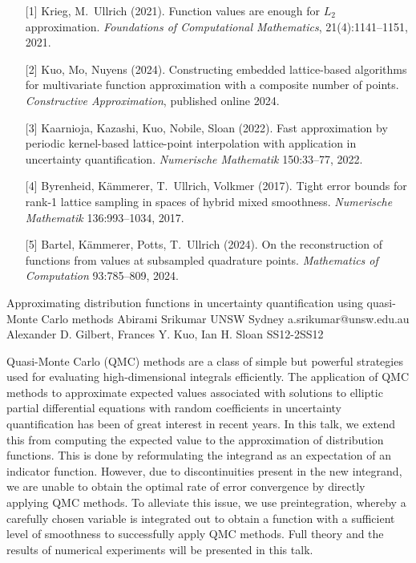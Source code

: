 \begin{talk}
\begin{enumerate}
	\item[{[1]}] Krieg, M.~Ullrich (2021). Function values are enough for $L_2$ approximation. {\it Foundations of Computational Mathematics}, 21(4):1141--1151, 2021.
    \item[{[2]}] Kuo, Mo, Nuyens (2024). Constructing embedded lattice-based algorithms for multivariate function approximation with a composite number of points. {\it Constructive Approximation}, published online 2024.
    \item[{[3]}] Kaarnioja, Kazashi, Kuo, Nobile, Sloan (2022). Fast approximation by periodic kernel-based lattice-point interpolation with application in uncertainty quantification. {\it Numerische Mathematik} 150:33--77, 2022.
    \item[{[4]}] Byrenheid, K{\"a}mmerer, T.~Ullrich, Volkmer (2017). Tight error bounds for rank-1 lattice sampling in spaces of hybrid mixed smoothness. {\it Numerische Mathematik} 136:993–1034, 2017.
    \item[{[5]}] Bartel, K{\"a}mmerer, Potts, T.~Ullrich (2024). On the reconstruction of functions from values at subsampled quadrature points. {\it Mathematics of Computation} 93:785--809, 2024.
\end{enumerate}


\end{talk}

\begin{talk}
  {Approximating distribution functions in uncertainty quantification using quasi-Monte
Carlo methods}%
  {Abirami Srikumar}%
  {UNSW Sydney}%
  {a.srikumar@unsw.edu.au}%
  {Alexander D. Gilbert, Frances Y. Kuo, Ian H. Sloan}%
{}{}{SS12-2}{SS12}

			
Quasi-Monte Carlo (QMC) methods are a class of simple but powerful strategies used for evaluating high-dimensional integrals efficiently. The application of QMC methods to approximate expected values associated with solutions to elliptic partial differential equations with random coefficients in uncertainty quantification has been of great interest in recent years. In this talk, we extend this from computing the expected value to the approximation of distribution functions. This is done by reformulating the integrand as an expectation of an indicator function. However, due to discontinuities present in the new integrand, we are unable to obtain the optimal rate of error convergence by directly applying QMC methods. To alleviate this issue, we use preintegration, whereby a carefully chosen variable is integrated out to obtain a function with a sufficient level of smoothness to successfully apply  QMC methods. Full theory and the results of numerical experiments will be presented in this talk.  


\end{talk}

